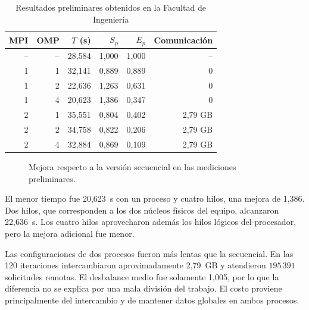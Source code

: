 \begin{table}[ht]
\centering
\caption{Resultados preliminares obtenidos en la Facultad de Ingeniería}
\label{tab:resultados-facultad}
\begin{tabular}{rrrrrr}
\toprule
MPI & OMP & $T$ (s) & $S_p$ & $E_p$ & Comunicación \\
\midrule
-- & -- & 28,584 & 1,000 & 1,000 & -- \\
1 & 1 & 32,141 & 0,889 & 0,889 & 0 \\
1 & 2 & 22,636 & 1,263 & 0,631 & 0 \\
1 & 4 & 20,623 & 1,386 & 0,347 & 0 \\
2 & 1 & 35,551 & 0,804 & 0,402 & 2,79 GB \\
2 & 2 & 34,758 & 0,822 & 0,206 & 2,79 GB \\
2 & 4 & 32,884 & 0,869 & 0,109 & 2,79 GB \\
\bottomrule
\end{tabular}
\end{table}

\begin{figure}[ht]
\centering
{}
\caption{Mejora respecto a la versión secuencial en las mediciones preliminares.}
\label{fig:speedup-facultad}
\end{figure}

El menor tiempo fue 20,623~s con un proceso y cuatro hilos, una mejora de
1,386. Dos hilos, que corresponden a los dos núcleos físicos del equipo,
alcanzaron 22,636~s. Los cuatro hilos aprovecharon además los hilos lógicos del
procesador, pero la mejora adicional fue menor.

Las configuraciones de dos procesos fueron más lentas que la secuencial. En
las 120 iteraciones intercambiaron aproximadamente 2,79~GB y atendieron $195\,391$ solicitudes
remotas. El desbalance medio fue solamente 1,005, por lo que la diferencia no
se explica por una mala división del trabajo. El costo proviene principalmente
del intercambio y de mantener datos globales en ambos procesos.

